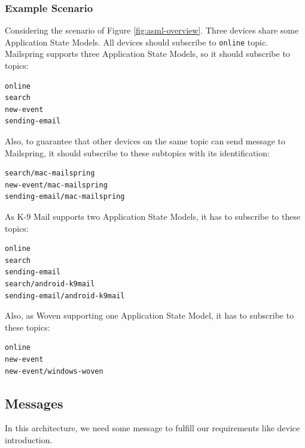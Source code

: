 \subsubsection{Example Scenario}
Considering the scenario of Figure \ref{fig:asml-overview}. Three devices share some Application State Models. All devices should subscribe to \lstinline[basicstyle=\ttfamily]{online} topic. Mailspring supports three Application State Models, so it should subscribe to topics:
\begin{verbatim}
online
search
new-event
sending-email
\end{verbatim}

Also, to guarantee that other devices on the same topic can send message to Mailspring, it should subscribe to these subtopics with its identification: 
\begin{verbatim}
search/mac-mailspring
new-event/mac-mailspring
sending-email/mac-mailspring
\end{verbatim}

As K-9 Mail supports two Application State Models, it has to subscribe to these topics:
\begin{verbatim}
online
search
sending-email
search/android-k9mail
sending-email/android-k9mail
\end{verbatim}


Also, as Woven supporting one Application State Model, it has to subscribe to these topics:
\begin{verbatim}
online
new-event
new-event/windows-woven
\end{verbatim}



\subsection{Messages}
In this architecture, we need some message to fulfill our requirements like device introduction.

